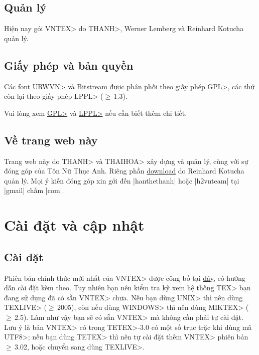 \documentclass[12pt,a4paper]{article}
\begin{document}
\subsection{Quản lý}
Hiện nay gói \<VNTEX> do \<THANH>, Werner Lemberg và Reinhard Kotucha quản
lý.

\subsection{Giấy phép và bản quyền}
Các font \<URWVN> và Bitstream được phân phối theo giấy phép
\<GPL>, các thứ còn lại theo giấy phép \<LPPL> ($\ge$\,1.3).

Vui lòng xem \href{http://www.gnu.org/licenses/gpl.txt}{\<GPL>} và
\href{http://www.latex-project.org/lppl.txt}{\<LPPL>} nếu cần biết thêm chi tiết.

\subsection{Về trang web này}
Trang web này do \<THANH> và \<THAIHOA> xây dựng và quản lý, cùng với
sự đóng góp của Tôn Nữ Thục Anh. Riêng phần
\href{http://vntex.sf.net/download}{download} do Reinhard Kotucha quản
lý. Mọi ý kiến đóng góp xin gởi đến |hanthethanh| hoặc |h2vnteam| tại
|gmail| chấm |com|.

\section{Cài đặt và cập nhật}
\subsection{Cài đặt}
Phiên bản chính thức mới nhất của \<VNTEX> được công bố tại
\href{http://vntex.sf.net/download/vntex}{đây}, có hướng dẫn cài đặt kèm theo.  Tuy nhiên
bạn nên kiểm tra kỹ xem hệ thống \<TEX> bạn đang sử dụng đã có sẵn
\<VNTEX> chưa. Nếu bạn dùng \<UNIX> thì nên dùng \<TEXLIVE>
($\ge$\,2005), còn nếu dùng \<WINDOWS> thì nên dùng \<MIKTEX>
($\ge$\,2.5). Làm như vậy bạn sẽ có sẵn \<VNTEX> mà không cần phải tự
cài đặt. Lưu ý là bản \<VNTEX> có trong \<TETEX>-3.0 có một số trục
trặc khi dùng mã \<UTF8>; nếu bạn dùng \<TETEX> thì nên tự cài đặt
thêm \<VNTEX> phiên bản $\ge$\,3.02, hoặc chuyển sang dùng \<TEXLIVE>.
\end{document}
